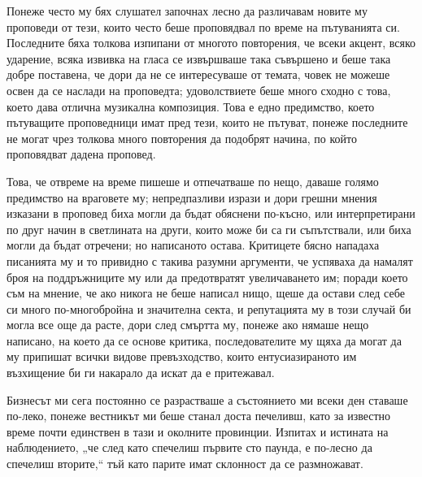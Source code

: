 \documentclass[12pt]{book}
\begin{document}
Понеже често му бях слушател започнах лесно да различавам новите му проповеди от тези, които често беше проповядвал по време на пътуванията си. Последните бяха толкова изпипани от многото повторения, че всеки акцент, всяко ударение, всяка извивка на гласа се извършваше така съвършено и беше така добре поставена, че дори да не се интересуваше от темата, човек не можеше освен да се наслади на проповедта; удоволствиете беше много сходно с това, което дава отлична музикална композиция. Това е едно предимство, което пътуващите проповедници имат пред тези, които не пътуват, понеже последните не могат чрез толкова много повторения да подобрят начина, по който проповядват дадена проповед.

Това, че отвреме на време пишеше и отпечатваше по нещо, даваше голямо предимство на враговете му; непредпазливи изрази и дори грешни мнения изказани в проповед биха могли да бъдат обяснени по-късно, или интерпретирани по друг начин в светлината на други, които може би са ги съпътствали, или биха могли да бъдат отречени; но написаното остава. Критицете бясно нападаха писанията му и то привидно с такива разумни аргументи, че успяваха да намалят броя на поддръжниците му или да предотвратят увеличаването им; поради което съм на мнение, че ако никога не беше написал нищо, щеше да остави след себе си много по-многобройна и значителна секта, и репутацията му в този случай би могла все още да расте, дори след смъртта му, понеже ако нямаше нещо написано, на което да се основе критика, последователите му щяха да могат да му припишат всички видове превъзходство, които ентусиазираното им възхищение би ги накарало да искат да е притежавал.

Бизнесът ми сега постоянно се разрастваше а състоянието ми всеки ден ставаше по-леко, понеже вестникът ми беше станал доста печеливш, като за известно време почти единствен в тази и околните провинции. Изпитах и истината на наблюдението, „че след като спечелиш първите сто паунда, е по-лесно да спечелиш вторите,“ тъй като парите имат склонност да се размножават.
\end{document}
